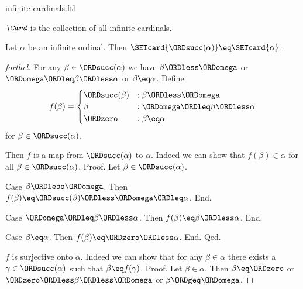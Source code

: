 \documentclass{naproche-library}
\begin{document}
\begin{smodule}[title=Infinite Cardinal Numbers]{infinite-cardinals.ftl}

\begin{definition}[forthel,id=SET_THEORY_07_4231078585827328]
  $\emph{\Card}$ is the collection of all infinite cardinals.
\end{definition}

\begin{proposition}[forthel,id=SET_THEORY_07_8189062544359424]
  Let $\alpha$ be an infinite ordinal.
  Then $\SETcard{\ORDsucc(\alpha)} \eq \SETcard{\alpha}$.
\end{proposition}
\begin{proof}[forthel]
  For any $\beta \in \ORDsucc(\alpha)$ we have
  $\beta \ORDless \ORDomega$ or $\ORDomega \ORDleq \beta \ORDless \alpha$ or $\beta \eq \alpha$.
  Define \[ f(\beta) =
    \begin{cases}
      \ORDsucc(\beta)  & : \beta \ORDless \ORDomega
      \\
      \beta         & : \ORDomega \ORDleq \beta \ORDless \alpha
      \\
      \ORDzero             & : \beta \eq \alpha
    \end{cases} \]
  for $\beta \in \ORDsucc(\alpha)$.

  Then $f$ is a map from $\ORDsucc(\alpha)$ to $\alpha$.
  Indeed we can show that $f(\beta) \in \alpha$ for all
  $\beta \in \ORDsucc(\alpha)$. \newline
  Proof.
    Let $\beta \in \ORDsucc(\alpha)$.

    Case $\beta \ORDless \ORDomega$.
      Then $f(\beta)
        \eq \ORDsucc(\beta)
        \ORDless \ORDomega
        \ORDleq \alpha$.
    End.

    Case $\ORDomega \ORDleq \beta \ORDless \alpha$.
      Then $f(\beta)
        \eq \beta
        \ORDless \alpha$.
    End.

    Case $\beta \eq \alpha$.
      Then $f(\beta)
        \eq \ORDzero
        \ORDless \alpha$.
    End.
  Qed.

  $f$ is surjective onto $\alpha$.
  Indeed we can show that for any $\beta \in \alpha$ there exists a
  $\gamma \in \ORDsucc(\alpha)$ such that $\beta \eq f(\gamma)$. \newline
  Proof.
    Let $\beta \in \alpha$.
    Then $\beta \eq \ORDzero$ or $\ORDzero \ORDless \beta \ORDless \ORDomega$ or $\beta \ORDgeq \ORDomega$.


\end{proof}
\end{smodule}
\end{document}
